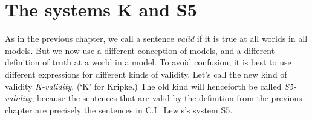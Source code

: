 



\section{The systems K and S5}\label{sec:systems-k-s5}

As in the previous chapter, we call a sentence \emph{valid} if it is true at all
worlds in all models. But we now use a different conception of models, and a
different definition of truth at a world in a model. To avoid confusion, it is
best to use different expressions for different kinds of validity. Let's call
the new kind of validity \emph{K-validity}. (`K' for Kripke.) The old kind will
henceforth be called \emph{S5-validity}, because the sentences that are valid by
the definition from the previous chapter are precisely the sentences in C.I.\
Lewis's system S5.

